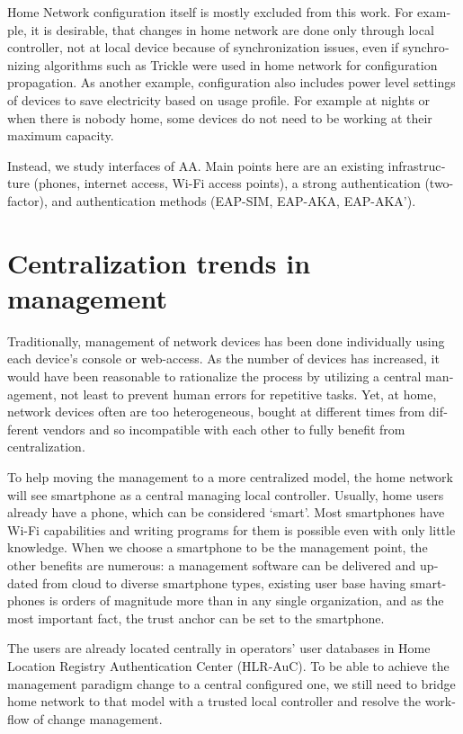 \documentclass[12pt,a4paper,english]{tutthesis}
\begin{document}
\begin{otherlanguage}{english}
Home Network configuration itself is mostly excluded from this work.
For example, 
it is desirable, that changes in home network are done only through
local controller, not at local device because of
synchronization issues, even 
if synchronizing algorithms such as Trickle\cite{rfc6206} were used in
home network for configuration propagation. As another example,
configuration also includes
power level settings of devices to save electricity based on usage
profile. For example at nights or when there is nobody home, some
devices do not need to be working at their maximum capacity. 

Instead, we study interfaces of AA.  Main points here are an existing
infrastructure (phones, internet access, Wi-Fi access points),  a strong
authentication (two-factor), and authentication methods
(EAP-SIM, EAP-AKA, EAP-AKA').
\section{Centralization trends in management}
\label{sec-3-2}

Traditionally, management of network devices has been done
individually using each device's console or web-access.  As the number of
devices has increased, it would have been reasonable to rationalize
the process by utilizing a central management, not least to prevent human
errors for repetitive tasks.  Yet, at home, network devices often are
too heterogeneous, bought at different times from different vendors
and so incompatible with each other to fully benefit from
centralization. 

To help moving the management to a more centralized
model, the home network will see smartphone as a central managing local
controller.
Usually, home users already have a phone, which can be considered 
`smart'. Most smartphones have Wi-Fi capabilities and writing programs
for them is possible even with only little knowledge.
When we choose a smartphone to be the management point, the other benefits are
numerous:  a management software can be delivered and
updated from cloud to diverse smartphone types, existing user
base having smartphones is orders of magnitude more than in any single
organization, and as the most important fact, the trust anchor can be set to the smartphone.

The users are already located centrally in operators' user databases
in Home Location Registry Authentication Center (HLR-AuC).  To be able
to achieve the management paradigm change to a central configured one,
we still need to bridge home network to that model with a trusted local controller
and resolve the work-flow of change management.



\end{otherlanguage}
\end{document}
